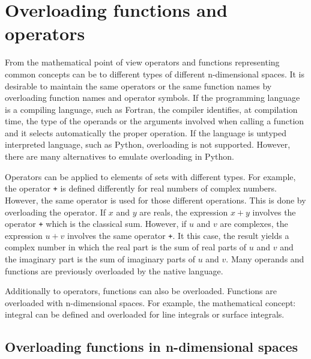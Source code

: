 
\chapter{Overloading functions and operators}
From the mathematical point of view operators and functions representing 
common concepts can be to different types of different n-dimensional spaces.
It is desirable to maintain the same operators or the same function names 
by overloading function names and operator symbols. 
If the programming language is a compiling language, such as Fortran, 
the compiler identifies, at compilation time, the type of the operands or the arguments 
involved when calling a function and it selects automatically the proper operation. 
If the language is untyped interpreted language, such as Python, overloading is not supported. 
However, there are many alternatives to emulate overloading in Python. 

Operators can be applied to elements of sets with different types.
For example, the operator \texttt{+} 
is defined differently for real numbers of complex numbers. However, the same operator 
is used for those different operations. This is done by overloading the operator. 
If $x$ and $y$ are reals, the expression $ x+y $ involves the operator \texttt{+}
which is the classical sum. 
However, if  $u$ and $v$ are complexes, 
the expression $ u+v $ involves the same operator \texttt{+}. It this case, 
the result yields a complex number in which 
the real part is the sum of real parts of $ u $ and $ v $
and the imaginary part is the sum of imaginary parts of $ u $ and $ v $.
Many operands and functions are previously overloaded by the native language.

Additionally to operators, functions can also be overloaded. 
Functions are overloaded with n-dimensional spaces. 
For example, the mathematical concept: integral 
can be defined and overloaded for line integrals or surface integrals. 
 

\newpage 
\section{Overloading functions in n-dimensional spaces}

